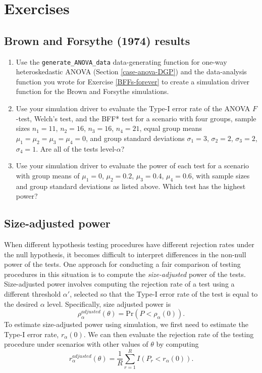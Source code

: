 \documentclass[
]{book}
\newcommand{\Prob}{\text{Pr}}
\begin{document}
\section{Exercises}\label{exercises-6}

\subsection{Brown and Forsythe (1974) results}\label{Brown-Forsythe-performance}

\begin{enumerate}
\def\labelenumi{\arabic{enumi}.}
\item
  Use the \texttt{generate\_ANOVA\_data} data-generating function for one-way heteroskedastic ANOVA (Section \ref{case-anova-DGP}) and the data-analysis function you wrote for Exercise \ref{BFFs-forever} to create a simulation driver function for the Brown and Forsythe simulations.
\item
  Use your simulation driver to evaluate the Type-I error rate of the ANOVA \(F\)-test, Welch's test, and the BFF* test for a scenario with four groups, sample sizes \(n_1 = 11\), \(n_2 = 16\), \(n_3 = 16\), \(n_4 = 21\), equal group means \(\mu_1 = \mu_2 = \mu_3 = \mu_4 = 0\), and group standard deviations \(\sigma_1 = 3\), \(\sigma_2 = 2\), \(\sigma_3 = 2\), \(\sigma_4 = 1\). Are all of the tests level-\(\alpha\)?
\item
  Use your simulation driver to evaluate the power of each test for a scenario with group means of \(\mu_1 = 0\), \(\mu_2 = 0.2\), \(\mu_3 = 0.4\), \(\mu_4 = 0.6\), with sample sizes and group standard deviations as listed above. Which test has the highest power?
\end{enumerate}

\subsection{Size-adjusted power}\label{size-adjusted-power}

When different hypothesis testing procedures have different rejection rates under the null hypothesis, it becomes difficult to interpret differences in the non-null power of the tests.
One approach for conducting a fair comparison of testing procedures in this situation is to compute the \emph{size-adjusted} power of the tests.
Size-adjusted power involves computing the rejection rate of a test using a different threshold \(\alpha'\), selected so that the Type-I error rate of the test is equal to the desired \(\alpha\) level.
Specifically, size adjusted power is
\[
\rho^{adjusted}_\alpha(\theta) = \Prob(P < \rho_\alpha(0)).
\]
To estimate size-adjusted power using simulation, we first need to estimate the Type-I error rate, \(r_\alpha(0)\). We can then evaluate the rejection rate of the testing procedure under scenarios with other values of \(\theta\) by computing
\[
r^{adjusted}_\alpha(\theta) = \frac{1}{R} \sum_{r=1}^R I(P_r < r_{\alpha}(0)).
\]
\end{document}
